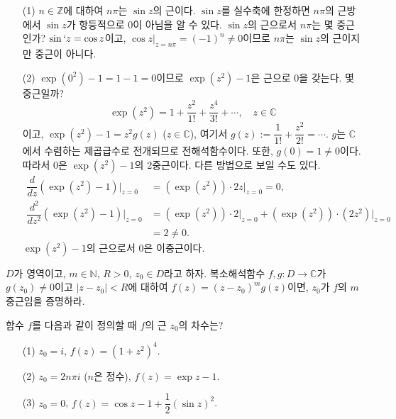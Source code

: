 \begin{saltexample}[label=example-4-6]{}{}
\begin{itemize}
\item[(1)] $n\in \mathbb Z$에 대하여 $n\pi$는 $\sin z$의 근이다.
$\sin z$를 실수축에 한정하면 $n\pi$의 근방에서 
$\sin z$가 항등적으로 $0$이 아님을 알 수 있다.
$\sin z$의 근으로서 $n\pi$는 몇 중근인가?
$\sin `z = \cos z$이고, $\cos z \Big|_{z=n\pi}= (-1)^n \ne 0$이므로
$n\pi$는 $\sin z$의 근이지만 중근이 아니다.
\item[(2)] $\exp(0^2) -1 = 1-1 = 0$이므로
$\exp (z^2) -1$은 근으로 $0$을 갖는다.
몇 중근일까?
\[
\exp (z^2) = 1 + \dfrac{z^2}{1!} + \dfrac{z^4}{3!} + \cdots,
\quad z\in \mathbb C
\]
이고, $\exp(z^2) -1 = z^2g(z)$ ($z\in \mathbb C$),
여기서 $g(z):= \dfrac1{1!} + \dfrac{z^2}{2!} = \cdots$.
$g$는 $\mathbb C$에서 수렴하는  제곱급수로 전개되므로
전해석함수이다. 또한, $g(0)=1\ne 0$이다.
따라서 $0$은 $\exp(z^2) -1$의 2중근이다.
다른 방법으로 보일 수도 있다.
\begin{align*}
\dfrac{d}{dz} (\exp(z^2)-1) \Big|_{z=0} 
&= (\exp(z^2))\cdot 2z  \Big|_{z=0}  = 0, \\
\dfrac{d^2}{dz^2} (\exp(z^2)-1)\Big|_{z=0} 
&=  (\exp(z^2))\cdot 2 \Big|_{z=0}  +  (\exp(z^2))\cdot (2z^2)  \Big|_{z=0}  \\
&= 2\ne 0.
\end{align*}
$\exp(z^2) -1$의 근으로서 $0$은 이중근이다.
\end{itemize}
\end{saltexample}

\begin{salt_exercise} \label{ex-4-17}
$D$가 영역이고, $m\in \mathbb N$, $R>0$, $z_0\in D$라고 하자.
복소해석함수 $f,g: D\to \mathbb C$가 $g(z_0)\ne0$이고
$|z-z_0|<R$에 대하여 $f(z) = (z-z_0)^m g(z)$이면,
$z_0$가 $f$의 $m$ 중근임을 증명하라.
\end{salt_exercise}

\begin{salt_exercise} \label{ex-4-18}
함수 $f$를 다음과 같이 정의할 때 $f$의 근 $z_0$의 차수는?
\begin{itemize}
\item[(1)]  $z_0 = i$, $f(z) = (1+z^2)^4$.
\item[(2)]  $z_0 = 2n\pi i$ ($n$은 정수), $f(z) = \exp z -1$.
\item[(3)] $z_0=0$, $f(z) = \cos z - 1 + \dfrac12(\sin z)^2$.
\end{itemize}
\end{salt_exercise}


